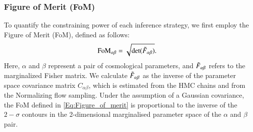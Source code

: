 \documentclass{aa}
\begin{document}
\subsubsection{Figure of Merit (FoM)}
To quantify the constraining power of each inference strategy, we first employ the Figure of Merit (FoM), defined as follows:
\begin{equation}\label{Eq:Figure_of_merit}
    \text{FoM}_{\alpha \beta}=\sqrt{\text{det}(\Tilde{F}_{\alpha \beta})}.
\end{equation}
Here, $\alpha$ and $\beta$ represent a pair of cosmological parameters, and $\Tilde{F}_{\alpha \beta}$ refers to the marginalized Fisher matrix. We calculate $\Tilde{F}_{\alpha \beta}$ as the inverse of the parameter space covariance matrix $C_{\alpha \beta}$, which is estimated from the HMC chains and from the Normalizing flow sampling. 
Under the assumption of a Gaussian covariance, the FoM defined in \autoref{Eq:Figure_of_merit} is proportional to the inverse of the $2-\sigma$ contours in the 2-dimensional marginalised parameter space of the $\alpha$ and $\beta$ pair.
\end{document}
